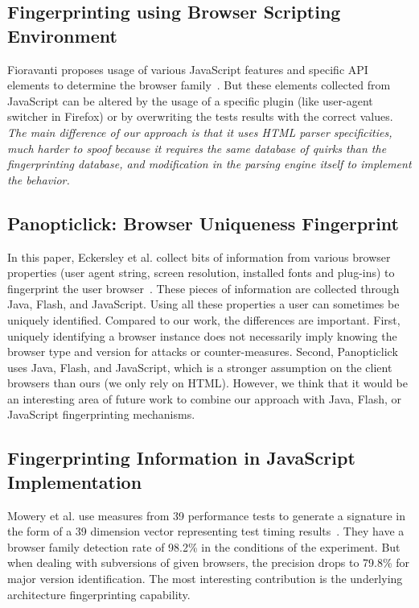 \documentclass[10pt]{IEEEtran}
\begin{document}
\subsection{Fingerprinting using Browser Scripting Environment}
    
Fioravanti proposes usage of various JavaScript features and specific API elements to determine 
the browser family~\cite{fioravanti2010client}. But these elements collected from JavaScript 
can be altered by the usage of a specific plugin (like user-agent switcher in Firefox) or by 
overwriting the tests results with the correct values. 
\textit{The main difference of our approach is that it uses HTML parser specificities, much harder
to spoof because it requires the same database of quirks than the fingerprinting database,
and modification in the parsing engine itself to implement the behavior.}


\subsection{Panopticlick: Browser Uniqueness Fingerprint}
\label{subsec:panopticlick}
In this paper, Eckersley et al. collect bits of information from various browser properties 
(user agent string, screen resolution, installed fonts and plug-ins) to fingerprint the user 
browser~\cite{eckersley2010unique}. These pieces of information are collected through Java, Flash, and
JavaScript. Using all these properties a user can sometimes be uniquely identified. 
Compared to our work, the differences are important.
First, uniquely identifying a browser instance does not necessarily imply knowing the browser type and version for attacks or counter-measures.
Second, Panopticlick uses Java, Flash, and JavaScript, which is a stronger assumption on the client browsers than ours (we only rely on HTML).
However, we think that it would be an interesting area of future work to combine our approach with Java, Flash, or JavaScript fingerprinting mechanisms.

\subsection{Fingerprinting Information in JavaScript Implementation}
    
Mowery et al. use measures from 39 performance tests to generate a signature in the form of a 39 
dimension vector representing test timing results~\cite{mowery2011fingerprinting}. They have a 
browser family detection rate of 98.2\% in the conditions of the experiment. But when dealing with subversions of given browsers, the precision drops to 79.8\% for major version identification. The most interesting contribution is the underlying architecture fingerprinting capability.
\end{document}
